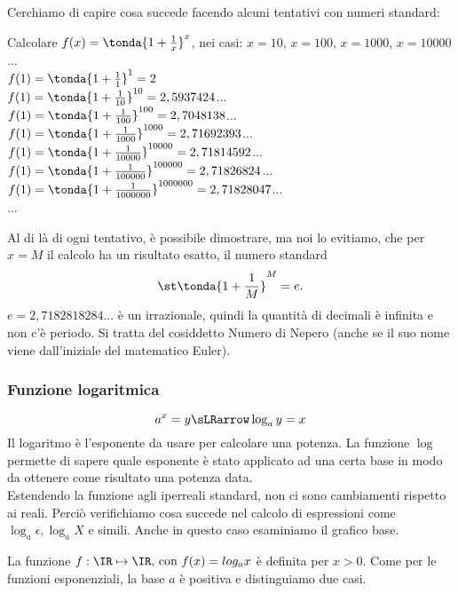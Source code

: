 Cerchiamo di capire cosa succede facendo alcuni tentativi con numeri standard:
\begin{esempio}
 Calcolare $f(x)= \tonda{1+\frac{1}{x}}^x$, nei casi: $x=10$, $x=100$, 
 $x=1000$, $x=10000$...\\
 $f(1)=\tonda{1+\frac{1}{1}}^1=2$\\
 $f(1)=\tonda{1+\frac{1}{10}}^{10}=2,5937424$...\\
 $f(1)=\tonda{1+\frac{1}{100}}^{100}=2,7048138$...\\
 $f(1)=\tonda{1+\frac{1}{1000}}^{1000}=2,71692393$...\\
 $f(1)=\tonda{1+\frac{1}{10000}}^{10000}=2,71814592$...\\
 $f(1)=\tonda{1+\frac{1}{100000}}^{100000}=2,71826824$...\\
 $f(1)=\tonda{1+\frac{1}{1000000}}^{1000000}=2,71828047$...\\
 ...
\end{esempio}

Al di là di ogni tentativo, è possibile dimostrare, ma noi lo evitiamo, 
che per $x=M$ il calcolo ha un risultato esatto, il numero standard
\[
 \st\tonda{1+\frac{1}{M}}^M=e.
\]
$e=2,7182818284...$ è un irrazionale, quindi la quantità 
di decimali è infinita e non c'è periodo. 
Si tratta del cosiddetto Numero di Nepero (anche se il suo nome viene 
dall'iniziale del matematico Euler). 

\subsubsection{Funzione logaritmica}
\label{subsubsec:insnum_log}
\[
 a^x=y \sLRarrow \log_a{y}=x
\]
Il logaritmo è l'esponente da usare per calcolare una potenza.
La funzione \(\log\) permette di sapere quale esponente è stato applicato
ad una certa base in modo da ottenere come risultato una potenza data.\\
Estendendo la funzione agli iperreali standard, non ci sono cambiamenti 
rispetto 
ai reali. Perciò verifichiamo cosa succede nel calcolo di espressioni come
$\log_a \epsilon, \log_a X$ e simili. Anche in questo caso esaminiamo il
grafico base.

La funzione \(f:\IR\mapsto \IR \text{, con } f(x)= log_a x\)
è definita per \(x>0\). Come per le funzioni esponenziali, 
la base \(a\) è positiva e distinguiamo due casi.

